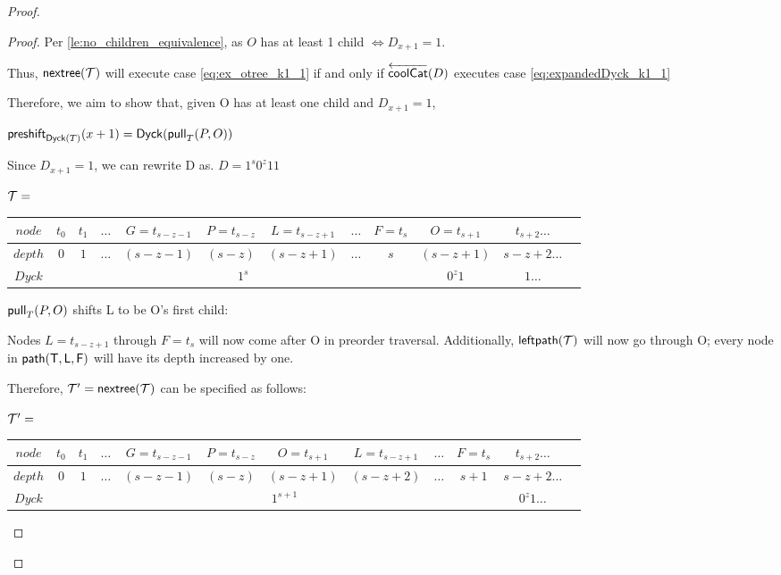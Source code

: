 \begin{proof}
\begin{proof}
    Per \ref{le:no_children_equivalence}, as $O$ has at least 1 child $\iff D_{x+1}=1$.

    Thus, $\nextTree{T}$ will execute case \eqref{eq:ex_otree_k1_1} if and only if $\coolCat{D}$ executes case \eqref{eq:expandedDyck_k1_1}

    Therefore, we aim to show that, given O has at least one child and $D_{x+1}=1$,

    $\preshift{\dyck{T}}{x+1}=\dyck{\poppush[T]{P}{O}}$

    Since $D_{x+1}=1$, we can rewrite D as.
    $D=1^s0^z11$


    \noindent $\tree{T}=$
    \begin{center}
	\begin{tabular}{ |c|c|c|c|c|c|c|c|c|c|c|c| } 
	    \hline

	    $node$ & $t_0$ & $t_1$ & $\dots$ & $G=t_{s-z-1}$ & $P=t_{s-z}$ & $L=t_{s-z+1}$ & $\dots$ & $F=t_s$ & $O=t_{s+1}$ & $t_{s+2}\dots$ \\
	    \hline
	    $depth$ & $0$ & $1$ & $\dots$ & $(s-z-1)$ & $(s-z)$ & $(s-z+1)$ & $\dots$ & $s$  & $(s-z+1)$ & $s-z+2 \dots$\\
	    \hline
	    $Dyck$ &  &  \multicolumn{7}{|c|}{$1^s$} &  $0^{z}1$   & $1\dots$\\
	    \hline
	\end{tabular}
    \end{center}

    $\poppush[T]{P}{O}$
    shifts L to be O's first child:

    Nodes $L=t_{s-z+1}$ through $F=t_s$ will now come after O in preorder traversal.  Additionally, $\leftdown{\tree{T}}$ will now go through O; every node in $\pathto{T}{L}{F}$ will have its depth increased by one.  

    Therefore, $\tree{T}'=\nextTree{T}$ can be specified as follows: 

    \noindent $\tree{T}'=$
    \begin{center}
	\begin{tabular}{ |c|c|c|c|c|c|c|c|c|c|c|c| } 
	    \hline

	    $node$ & $t_0$ & $t_1$ & $\dots$ & $G=t_{s-z-1}$ & $P=t_{s-z}$ & $O=t_{s+1}$ & $L=t_{s-z+1}$ & $\dots$ & $F=t_s$  & $t_{s+2}\dots$ \\
	    \hline
	    $depth$ & $0$ & $1$ & $\dots$ & $(s-z-1)$ & $(s-z)$ & $(s-z+1)$ & $(s-z+2)$ & $\dots$ & $s+1$  & $s-z+2 \dots$\\
	    \hline
	    $Dyck$ &  &  \multicolumn{8}{|c|}{$1^{s+1}$}  & $0^{z}1\dots$\\
	    \hline
	\end{tabular}
    \end{center}


\end{proof}
\end{proof}
